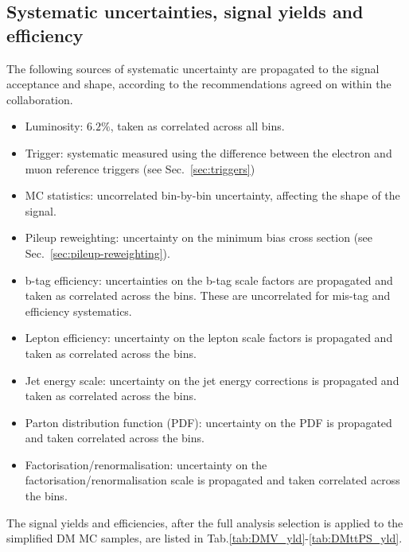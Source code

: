 \subsection{Systematic uncertainties, signal yields and efficiency}
The following sources of systematic uncertainty are propagated to the signal 
acceptance and shape, according to the recommendations agreed on within the
collaboration.
\begin{itemize}
    \item Luminosity: $6.2\%$, taken as correlated across all bins.
    \item Trigger: systematic measured using the difference between the electron
        and muon reference triggers (see Sec.~\ref{sec:triggers})
    \item MC statistics: uncorrelated bin-by-bin uncertainty, affecting the 
        shape of the signal. 
    \item Pileup reweighting: uncertainty on the minimum bias cross section 
        (see Sec.~\ref{sec:pileup-reweighting}).
    \item b-tag efficiency: uncertainties on the b-tag scale factors are 
        propagated and taken as correlated across the bins. These are 
        uncorrelated for mis-tag and efficiency systematics.
    \item Lepton efficiency: uncertainty on the lepton scale factors is 
        propagated and taken as correlated across the bins. 
    \item Jet energy scale: uncertainty on the jet energy corrections is 
        propagated and taken as correlated across the bins.
    \item Parton distribution function (PDF): uncertainty on the PDF is
        propagated and taken correlated across the bins.
    \item Factorisation/renormalisation: uncertainty on the 
        factorisation/renormalisation scale is propagated and taken correlated
        across the bins.
\end{itemize}

The signal yields and efficiencies, after the full analysis selection is applied
to the simplified DM MC samples, are listed in Tab.\ref{tab:DMV_yld}-\ref{tab:DMttPS_yld}.

\clearpage

